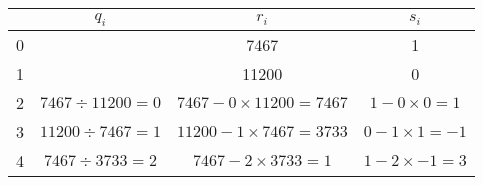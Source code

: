 \begin{center}
\begin{tabular}{|c|c|c|c|}
\hline & $q_i$ & $r_i$ & $s_i$ \\\hline
0 & & 7467 & 1 \\\hline
1 & & 11200 & 0 \\\hline
2 & $ 7467\div11200=0$ & $7467-0\times11200=7467$ & $1-0\times0=1$ \\\hline
3 & $ 11200\div7467=1$ & $11200-1\times7467=3733$ & $0-1\times1=-1$ \\\hline
4 & $ 7467\div3733=2$ & $7467-2\times3733=1$ & $1-2\times-1=3$ \\\hline
\end{tabular}
\end{center}
